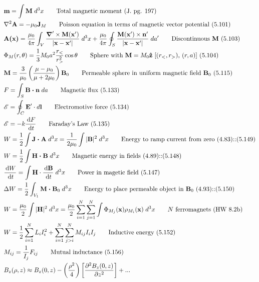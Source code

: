\documentclass[10pt]{article}
\newcommand{\zhat}{\boldsymbol{\hat{\textbf{z}}}}
\newcommand{\ve}[1]{\boldsymbol{\mathbf{#1}}}
\newcommand{\vect}[1]{\boldsymbol{\mathbf{#1}}}
\newcommand{\dd}{\, \mathrm{d}}
\newcommand{\tder}[2]{\frac{\dd #1}{\dd #2}}
\newcommand{\dpder}[2]{\frac{\partial^2 #1}{\partial #2^2}}
\begin{document}
\begin{multicols}{2}
\begin{align*}
		& \ve{m} = \int \ve{M} \; d^3 x \tag*{Total magnetic moment (J. pg. 197)} \\
		& \nabla^2 \vect{A} = -\mu_0 \vect{J}_M \tag*{Poisson equation in terms of magnetic vector potential (5.101)} \\
		& \vect{A(x)} = \frac{\mu_0}{4 \pi} \int_V \frac{\vect{\nabla}' \times \vect{M}(\vect{x}')}{|\vect{x} - \vect{x}'|} \; d^3 x + \frac{\mu_0}{4 \pi} \oint_S \frac{\vect{M}(\vect{x}') \times \vect{n}'}{|\vect{x} - \vect{x}'|} \; da' \tag*{Discontinuous $\ve{M}$ (5.103)}\\
		& \Phi_M(r,\theta) = \frac{1}{3} M_0 a^2 \frac{r_<}{r_>^2} \cos \theta \tag*{Sphere with $\ve{M} = M_0 \zhat$ [$(r_<,r_>)$, $(r,a)$] (5.104)} \\
		& \vect{M} = \frac{3}{\mu_0} \left( \frac{\mu - \mu_0}{\mu + 2 \mu_0} \right) \vect{B}_0 \tag*{Permeable sphere in uniform magnetic field $\ve{B}_0$ (5.115)} \\
		& F = \int_S \vect{B \cdot n} \; da \tag*{Magnetic flux (5.133)} \\
		& \mathscr{E} = \oint_C \vect{E}' \cdot d \vect{l} \tag*{Electromotive force (5.134)} \\
		& \mathscr{E} = -k \tder{F}{t} \tag*{Faraday's Law (5.135)} \\
		& W = \frac{1}{2} \int \vect{J \cdot A} \; d^3 x = \frac{1}{2 \mu_0} \int |\ve{B}|^2 \; d^3 x \tag*{Energy to ramp current from zero (4.83)::(5.149)} \\
		& W = \frac{1}{2} \int \vect{H \cdot B} \; d^3 x \tag*{Magnetic energy in fields (4.89)::(5.148)} \\
		& \tder{W}{t} = \int \ve{H} \cdot \tder{\ve{B}}{t} \; d^3 x \tag*{Power in magetic field (5.147)} \\
		& \Delta W = \frac{1}{2} \int_{V_1} \vect{M \cdot B}_0 \; d^3 x \tag*{Energy to place permeable object in $\ve{B}_0$ (4.93)::(5.150)} \\
		& W = \frac{\mu_0}{2} \int |\ve{H}|^2 \; d^3 x = \frac{\mu_0}{2} \sum_{i=1}^{N} \sum_{j=1}^{N} \int \Phi_{M_j}(\ve{x}) \rho_{M_i}(\ve{x}) \; d^3 x \tag*{$N$ ferromagnets (HW 8.2b)} \\
		& W = \frac{1}{2} \sum_{i=1}^N L_i I_i^2 + \sum_{i=1}^N \sum_{j>i}^N M_{ij} I_i I_j \tag*{Inductive energy (5.152)} \\
		& M_{ij} = \frac{1}{I_j} F_{ij} \tag*{Mutual inductance (5.156)} \\
		& B_z(\rho, z) \approx B_z(0,z) - \left( \frac{\rho^2}{4} \right) \left[ \dpder{B_z(0,z)}{z} \right] + ... \\

\end{align*}
\end{multicols}
\end{document}
